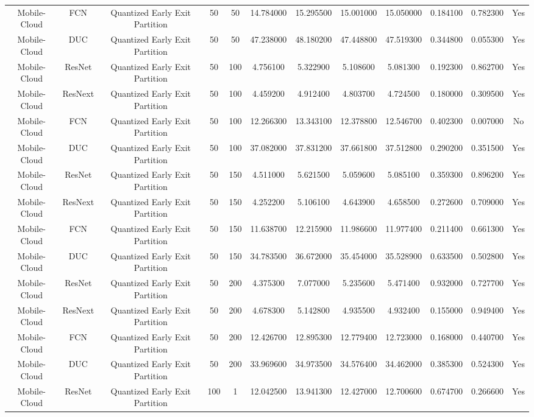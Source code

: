 \begin{tabular}{|c||c||c||c||c||c||c||c||c||c||c||c|}
Mobile-Cloud & FCN & Quantized Early Exit Partition & 50 & 50 & 14.784000 & 15.295500 & 15.001000 & 15.050000 & 0.184100 & 0.782300 & Yes \\
Mobile-Cloud & DUC & Quantized Early Exit Partition & 50 & 50 & 47.238000 & 48.180200 & 47.448800 & 47.519300 & 0.344800 & 0.055300 & Yes \\
Mobile-Cloud & ResNet & Quantized Early Exit Partition & 50 & 100 & 4.756100 & 5.322900 & 5.108600 & 5.081300 & 0.192300 & 0.862700 & Yes \\
Mobile-Cloud & ResNext & Quantized Early Exit Partition & 50 & 100 & 4.459200 & 4.912400 & 4.803700 & 4.724500 & 0.180000 & 0.309500 & Yes \\
Mobile-Cloud & FCN & Quantized Early Exit Partition & 50 & 100 & 12.266300 & 13.343100 & 12.378800 & 12.546700 & 0.402300 & 0.007000 & No \\
Mobile-Cloud & DUC & Quantized Early Exit Partition & 50 & 100 & 37.082000 & 37.831200 & 37.661800 & 37.512800 & 0.290200 & 0.351500 & Yes \\
Mobile-Cloud & ResNet & Quantized Early Exit Partition & 50 & 150 & 4.511000 & 5.621500 & 5.059600 & 5.085100 & 0.359300 & 0.896200 & Yes \\
Mobile-Cloud & ResNext & Quantized Early Exit Partition & 50 & 150 & 4.252200 & 5.106100 & 4.643900 & 4.658500 & 0.272600 & 0.709000 & Yes \\
Mobile-Cloud & FCN & Quantized Early Exit Partition & 50 & 150 & 11.638700 & 12.215900 & 11.986600 & 11.977400 & 0.211400 & 0.661300 & Yes \\
Mobile-Cloud & DUC & Quantized Early Exit Partition & 50 & 150 & 34.783500 & 36.672000 & 35.454000 & 35.528900 & 0.633500 & 0.502800 & Yes \\
Mobile-Cloud & ResNet & Quantized Early Exit Partition & 50 & 200 & 4.375300 & 7.077000 & 5.235600 & 5.471400 & 0.932000 & 0.727700 & Yes \\
Mobile-Cloud & ResNext & Quantized Early Exit Partition & 50 & 200 & 4.678300 & 5.142800 & 4.935500 & 4.932400 & 0.155000 & 0.949400 & Yes \\
Mobile-Cloud & FCN & Quantized Early Exit Partition & 50 & 200 & 12.426700 & 12.895300 & 12.779400 & 12.723000 & 0.168000 & 0.440700 & Yes \\
Mobile-Cloud & DUC & Quantized Early Exit Partition & 50 & 200 & 33.969600 & 34.973500 & 34.576400 & 34.462000 & 0.385300 & 0.524300 & Yes \\
Mobile-Cloud & ResNet & Quantized Early Exit Partition & 100 & 1 & 12.042500 & 13.941300 & 12.427000 & 12.700600 & 0.674700 & 0.266600 & Yes \\

\end{tabular}
